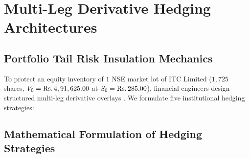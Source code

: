 
\section{Multi-Leg Derivative Hedging Architectures}
\label{sec:hedging_architectures}

\subsection{Portfolio Tail Risk Insulation Mechanics}

To protect an equity inventory of $1$ NSE market lot of ITC Limited ($1,725$ shares, $V_0 = \text{\text{Rs.}\,}4,91,625.00$ at $S_0 = \text{\text{Rs.}\,}285.00$), financial engineers design structured multi-leg derivative overlays \citep{hull2018options}. We formulate five institutional hedging strategies:

\subsection{Mathematical Formulation of Hedging Strategies}

